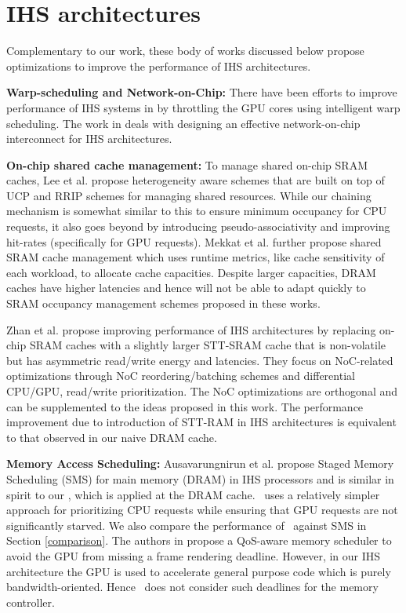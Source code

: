 \begin{itemize}
\end{itemize}
\section{IHS architectures} \label{related-work-ihs-architecture}
Complementary to our work, these body of works discussed below propose optimizations to improve the performance of IHS architectures. 
\par \textbf{Warp-scheduling and Network-on-Chip:} There have been efforts to improve performance of IHS systems in \cite{gpu-concurrency} by throttling the GPU cores using intelligent warp scheduling. The work in \cite{interconnect} deals with designing an effective network-on-chip interconnect for IHS architectures. 
\par \textbf{On-chip shared cache management:} To manage shared on-chip SRAM caches, Lee et al. \cite{tap}  propose heterogeneity aware schemes that are built on top of UCP and RRIP schemes for managing shared resources. While our chaining mechanism is somewhat similar to this to ensure minimum occupancy for CPU requests, it also goes beyond by introducing pseudo-associativity and improving hit-rates (specifically for GPU requests). Mekkat et al. \cite{helm} further propose shared SRAM cache management which uses runtime metrics, like cache sensitivity of each workload, to allocate cache capacities. Despite larger capacities, DRAM caches have higher latencies and hence will not be able to adapt quickly to SRAM occupancy management schemes proposed in these works. 
\par Zhan et al. \cite{oscar} propose improving performance of IHS architectures by replacing on-chip SRAM caches with a slightly larger STT-SRAM cache that is non-volatile but has asymmetric read/write energy and latencies. They focus on NoC-related optimizations through NoC reordering/batching schemes and differential CPU/GPU, read/write prioritization. The NoC optimizations are orthogonal and can be supplemented to the ideas proposed in this work. The performance improvement due to introduction of STT-RAM in IHS architectures is equivalent to that observed in our naive DRAM cache.
\par \textbf{Memory Access Scheduling:} Ausavarungnirun et al. \cite{sms} propose Staged Memory Scheduling (SMS) for main memory (DRAM) in IHS processors and is similar in spirit to our \prioname, which is applied at the DRAM cache. \prioname\ uses a relatively simpler approach for prioritizing CPU requests while ensuring that GPU requests are not significantly starved. We also compare the performance of \cachename\ against SMS in Section \ref{comparison}. The authors in \cite{qos-aware} propose a QoS-aware memory scheduler to avoid the GPU from missing a frame rendering deadline. However, in our IHS architecture the GPU is used to accelerate general purpose code which is purely bandwidth-oriented. Hence \prioname\ does not consider such deadlines for the memory controller.
